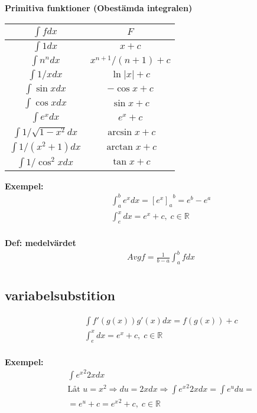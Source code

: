 \documentclass{article}
\begin{document}
\textbf{Primitiva funktioner (Obestämda integralen)}
\begin{center}
\begin{tabular}{ |c|c| } 
  \hline
  $\int f dx$             & $F$              \\
  \hline
 $\int 1dx$               & $x+c$            \\
 $\int n^n dx$            & $x^{n+1}/(n+1)+c$ \\ 
 $\int 1/x dx$            & $\ln{|x|}+c$     \\  
 $\int\sin{x}dx$          & $-\cos{x}+c$     \\ 
 $\int\cos{x}dx$          & $\sin{x}+c$      \\
 $\int e^x dx$            & $e^x+c$          \\
 $\int 1/\sqrt{1-x^2} dx$ & $\arcsin{x}+c$   \\
 $\int 1/(x^2+1) dx$      & $\arctan{x}+c$   \\ %
 $\int 1/\cos^2{x} dx$    & $\tan{x}+c$      \\
 \hline
\end{tabular}
\end{center}

\textbf{Exempel: }
\begin{align*}
  &\quad  \int_a^b e^x dx = {{[e^x]}_a}^b = e^b-e^a \\
  &\quad  \int_ e^x dx=e^x + c, \; c \in \mathbb{R} \\
\end{align*}

\textbf{Def: medelvärdet}
\begin{align*}
  &\quad  Avgf = \frac{1}{b-a} \int_a^b f dx \\
\end{align*}


\newpage

\subsection{variabelsubstition}
\begin{align*}
  &\quad  \int f'(g(x))g'(x) dx = f(g(x))+c \\
  &\quad  \int_ e^x dx=e^x + c, \; c \in \mathbb{R} \\
\end{align*}

\textbf{Exempel: }
\begin{align*}
  &\quad  \int {e^x}^2 2x dx  \\
  &\quad  \text{Låt } u=x^2 \Rightarrow du=2x dx \Rightarrow \int {e^x}^2 2x dx=\int e^u du = \\
  &\quad  = e^u+c={e^x}^2+c, \; c\in\mathbb{R} \\
\end{align*}
\end{document}
